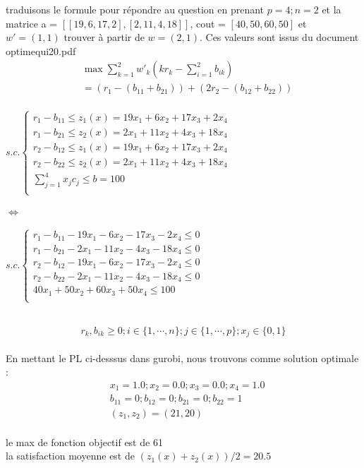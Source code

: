 \documentclass[16pt, a4paper]{article}
\begin{document}
\begin{flushleft}
\begin{justify}
traduisons le formule pour répondre au question en prenant  $p=4; n=2$ et la matrice a = $[[19,6,17,2], [2,11,4,18]]$, cout = $[40,50, 60,50]$ et $w' = (1,1)$ trouver à partir de $w = (2,1)$. Ces valeurs sont issus du document optimequi20.pdf\\
\begin{align*}
& \max\sum_{k=1}^2w'_k(kr_k-\sum_{i=1}^2b_{ik}) \\
& = (r_1-(b_{11}+b_{21}))+(2r_2-(b_{12}+b_{22}))\\
\end{align*}

\begin{center}
$ s.c.  \begin{cases}
r_1 - b_{11} \leq z_1(x) = 19x_{1} + 6x_{2} + 17x_{3}+ 2x_{4} \\
r_1 - b_{21} \leq z_2(x)  = 2x_{1} + 11x_{2} + 4x_{3}+ 18x_{4}\\
r_2 - b_{12} \leq z_1(x) = 19x_{1} + 6x_{2} + 17x_{3}+ 2x_{4}\\
r_2 - b_{22} \leq z_2(x) = 2x_{1} + 11x_{2} + 4x_{3}+ 18x_{4}\\
\sum_{j = 1}^4 x_{j}c_j \leq b = 100\\
        \end{cases} $\\
\end{center}
$\iff$
\begin{center}
$ s.c.  \begin{cases}
r_1 - b_{11} - 19x_{1} - 6x_{2} - 17x_{3}- 2x_{4} \leq  0 \\
r_1 - b_{21} - 2x_{1} - 11x_{2} -  4x_{3}- 18x_{4}\leq 0\\
r_2 - b_{12} - 19x_{1} - 6x_{2} - 17x_{3}- 2x_{4} \leq 0 \\
r_2 - b_{22} - 2x_{1} - 11x_{2} -  4x_{3}- 18x_{4} \leq 0\\
40x_1 + 50x_2 + 60x_3+50x_4 \leq 100\\
        \end{cases} $\\
\end{center}\\
$$ r_{k}, b_{ik} \geq 0 ; i\in \{1,\cdots, n\} ; j \in \{1,\cdots,p\} ; x_{j} \in \{0,1\}$$\\

En mettant le PL ci-desssus dans gurobi, nous trouvons comme solution optimale : 
\begin{align*}
& x_1 = 1.0;
x_2 = 0.0;
x_3 = 0.0;
x_4 = 1.0\\ 
& b_{11} = 0; 
b_{12} = 0 ;
b_{21} = 0 ;
b_{22} = 1\\
& (z_1, z_2) = (21, 20)\\
\end{align*}
\begin{center}
    le max de fonction objectif est de 61\\
    la satisfaction moyenne est de $(z_1(x) + z_2(x)) /2 = 20.5$
\end{center}\\


\end{justify}
\end{flushleft}
\end{document}
